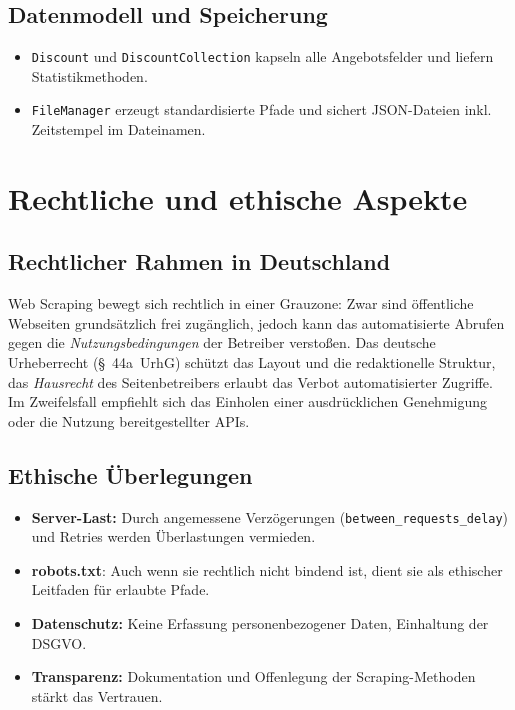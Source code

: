 \subsection{Datenmodell und Speicherung}
\begin{itemize}
  \item \texttt{Discount} und \texttt{DiscountCollection} kapseln alle Angebotsfelder und liefern Statistikmethoden.  
  \item \texttt{FileManager} erzeugt standardisierte Pfade und sichert JSON-Dateien inkl. Zeitstempel im Dateinamen.  
\end{itemize}

\section{Rechtliche und ethische Aspekte}
\subsection{Rechtlicher Rahmen in Deutschland}
Web Scraping bewegt sich rechtlich in einer Grauzone: Zwar sind öffentliche Webseiten grundsätzlich frei zugänglich, jedoch kann das automatisierte Abrufen gegen die \emph{Nutzungsbedingungen} der Betreiber verstoßen. Das deutsche Urheberrecht (§ 44a UrhG) schützt das Layout und die redaktionelle Struktur, das \emph{Hausrecht} des Seitenbetreibers erlaubt das Verbot automatisierter Zugriffe. Im Zweifelsfall empfiehlt sich das Einholen einer ausdrücklichen Genehmigung oder die Nutzung bereitgestellter APIs.

\subsection{Ethische Überlegungen}
\begin{itemize}
  \item \textbf{Server-Last:} Durch angemessene Verzögerungen (\texttt{between\_requests\_delay}) und Retries werden Überlastungen vermieden.  
  \item \textbf{robots.txt}: Auch wenn sie rechtlich nicht bindend ist, dient sie als ethischer Leitfaden für erlaubte Pfade.  
  \item \textbf{Datenschutz:} Keine Erfassung personenbezogener Daten, Einhaltung der DSGVO.  
  \item \textbf{Transparenz:} Dokumentation und Offenlegung der Scraping-Methoden stärkt das Vertrauen.  
\end{itemize}


